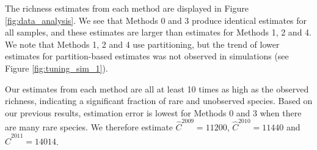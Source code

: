 \documentclass[12pt]{article}
\theoremstyle{break}
\theoremstyle{break}
\begin{document}



The richness estimates from each method are displayed in Figure \ref{fig:data_analysis}.  We see that Methods 0 and 3 produce identical estimates for all samples, and these estimates are larger than estimates for Methods 1, 2 and 4. We note that Methods 1, 2 and 4 use partitioning, but the trend of lower estimates for partition-based estimates was not observed in simulations (see Figure \ref{fig:tuning_sim_1}).



Our estimates from each method are all at least 10 times as high as the observed richness, indicating a significant fraction of rare and unobserved species. Based on our previous results, estimation error is lowest for Methods 0 and 3 when there are many rare species. We therefore estimate $\widehat{C}^{2009} = 11200$, $\widehat{C}^{2010} = 11440$ and $\widehat{C}^{2011} = 14014$.
\end{document}
